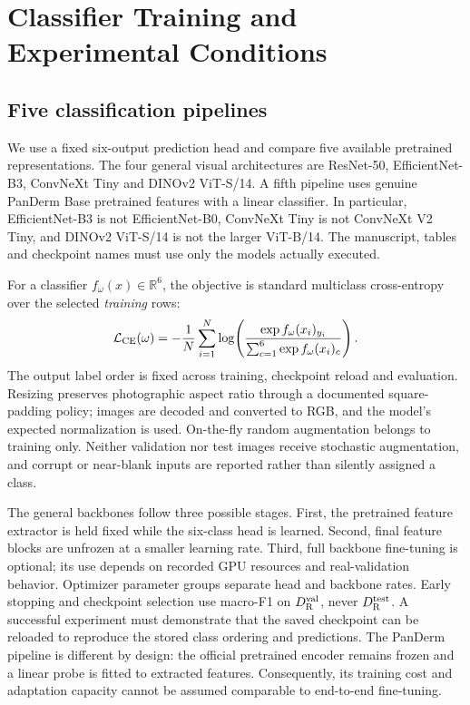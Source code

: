 \section{Classifier Training and Experimental Conditions}
\subsection{Five classification pipelines}
We use a fixed six-output prediction head and compare five available pretrained representations. The four general visual architectures are ResNet-50, EfficientNet-B3, ConvNeXt Tiny and DINOv2 ViT-S/14. A fifth pipeline uses genuine PanDerm Base pretrained features with a linear classifier. In particular, EfficientNet-B3 is not EfficientNet-B0, ConvNeXt Tiny is not ConvNeXt V2 Tiny, and DINOv2 ViT-S/14 is not the larger ViT-B/14. The manuscript, tables and checkpoint names must use only the models actually executed.

For a classifier $f_\omega(x)\in\mathbb{R}^{6}$, the objective is standard multiclass cross-entropy over the selected \emph{training} rows:
\begin{equation}
\mathcal{L}_{\rm CE}(\omega)=
-\frac{1}{N}\sum_{i=1}^{N}
\log\!\left(
\frac{\exp f_\omega(x_i)_{y_i}}
{\sum_{c=1}^{6}\exp f_\omega(x_i)_c}
\right).
\label{eq:loss}
\end{equation}
The output label order is fixed across training, checkpoint reload and evaluation. Resizing preserves photographic aspect ratio through a documented square-padding policy; images are decoded and converted to RGB, and the model's expected normalization is used. On-the-fly random augmentation belongs to training only. Neither validation nor test images receive stochastic augmentation, and corrupt or near-blank inputs are reported rather than silently assigned a class.

The general backbones follow three possible stages. First, the pretrained feature extractor is held fixed while the six-class head is learned. Second, final feature blocks are unfrozen at a smaller learning rate. Third, full backbone fine-tuning is optional; its use depends on recorded GPU resources and real-validation behavior. Optimizer parameter groups separate head and backbone rates. Early stopping and checkpoint selection use macro-F1 on $D_{\mathrm{R}}^{\mathrm{val}}$, never $D_{\mathrm{R}}^{\mathrm{test}}$. A successful experiment must demonstrate that the saved checkpoint can be reloaded to reproduce the stored class ordering and predictions. The PanDerm pipeline is different by design: the official pretrained encoder remains frozen and a linear probe is fitted to extracted features. Consequently, its training cost and adaptation capacity cannot be assumed comparable to end-to-end fine-tuning.

